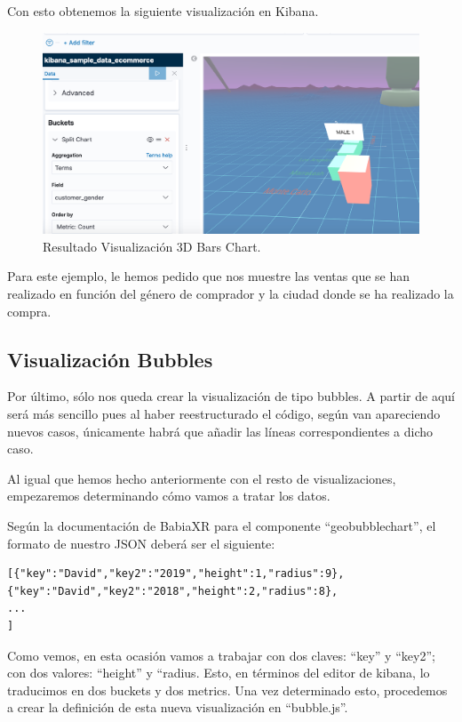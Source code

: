 \documentclass[a4paper, 12pt]{book}
\begin{document}
Con esto obtenemos la siguiente visualización en Kibana.

\begin{figure}[H]
  \centering
  \includegraphics[width=12cm, keepaspectratio]{img/development/3d-bar-chart.png}
  \caption{Resultado Visualización 3D Bars Chart.}
  \label{fig:3dbarchart}
\end{figure}

Para este ejemplo, le hemos pedido que nos muestre las ventas que se han realizado en función del género de comprador y la ciudad donde se ha realizado la compra.

\subsection{Visualización Bubbles}

Por último, sólo nos queda crear la visualización de tipo bubbles. A partir de aquí será más sencillo pues al haber reestructurado el código, según van apareciendo nuevos casos, únicamente habrá que añadir las líneas correspondientes a dicho caso.

Al igual que hemos hecho anteriormente con el resto de visualizaciones, empezaremos determinando cómo vamos a tratar los datos.

Según la documentación de BabiaXR para el componente “geobubblechart”, el formato de nuestro JSON deberá ser el siguiente:

\begin{lstlisting}[frame=single]
[{"key":"David","key2":"2019","height":1,"radius":9},
{"key":"David","key2":"2018","height":2,"radius":8},
...
]
\end{lstlisting}

Como vemos, en esta ocasión vamos a trabajar con dos claves: “key” y “key2”; con dos valores: “height” y “radius. Esto, en términos del editor de kibana, lo traducimos en dos buckets y dos metrics. Una vez determinado esto, procedemos a crear la definición de esta nueva visualización en “bubble.js”.
\end{document}
